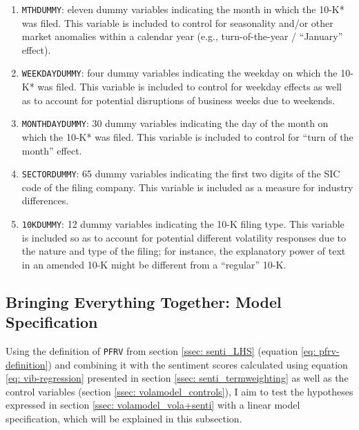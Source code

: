 \begin{enumerate}[(1)]
\item \texttt{MTHDUMMY}: eleven dummy variables indicating the month in which the 10-K* was filed. This variable is included to control for seasonality and/or other market anomalies within a calendar year (e.g., turn-of-the-year / \enquote{January} effect).

\item \texttt{WEEKDAYDUMMY}: four dummy variables indicating the weekday on which the 10-K* was filed. This variable is included to control for weekday effects as well as to account for potential disruptions of business weeks due to weekends. 

\item \texttt{MONTHDAYDUMMY}: 30 dummy variables indicating the day of the month on which the 10-K* was filed. This variable is included to control for \enquote{turn of the month} effect. 

\item \texttt{SECTORDUMMY}: 65 dummy variables indicating the first two digits of the SIC code of the filing company. This variable is included as a measure for industry differences.

\item \texttt{10KDUMMY}: 12 dummy variables indicating the 10-K filing type. This variable is included so as to account for potential different volatility responses due to the nature and type of the filing; for instance, the explanatory power of text in an amended 10-K might be different from a \enquote{regular} 10-K. 

\end{enumerate}


\subsection{Bringing Everything Together: Model Specification}
\label{ssec: volamodel_models}
Using the definition of \texttt{PFRV} from section \ref{ssec: senti_LHS} (equation \eqref{eq: pfrv-definition}) and combining it with the sentiment scores calculated using equation \eqref{eq: vib-regression} presented in section \ref{ssec: senti_termweighting} as well as the control variables (section \ref{ssec: volamodel_controls}), I aim to test the hypotheses expressed in section \ref{ssec: volamodel_vola+senti} with a linear model specification, which will be explained in this subsection. 

